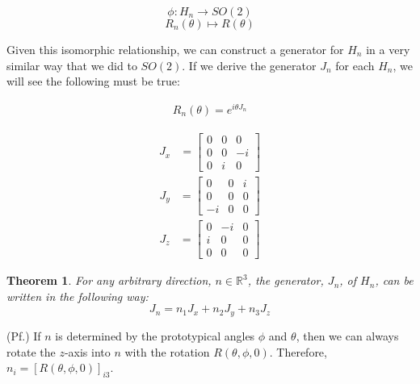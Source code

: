 \documentclass[10pt]{ucthesis}
\newcommand{\R}{\mathbb{R}}
\newtheorem{theorem}[definition]{Theorem}
\begin{document}
$$\phi:H_n \rightarrow SO(2)$$
$$R_n(\theta) \mapsto R(\theta)$$

Given this isomorphic relationship, we can construct a generator for $H_n$ in a very similar way that we did to $SO(2)$. If we derive the generator $J_n$ for each $H_n$, we will see the following must be true:

\begin{equation}
	\begin{aligned}
		R_n(\theta) = e^{i\theta J_n}
	\end{aligned}
\end{equation}

\begin{equation}
	\begin{aligned}
		J_x &= \begin{bmatrix}
					0 & 0 & 0 \\
					0 & 0 & -i \\
					0 & i & 0
					\end{bmatrix}
	\end{aligned}
\end{equation}
\begin{equation}
	\begin{aligned}
		J_y &= \begin{bmatrix}
					0 & 0 & i \\
					0 & 0 & 0 \\
					-i & 0 & 0
					\end{bmatrix}
	\end{aligned}
\end{equation}
\begin{equation}
	\begin{aligned}
		J_z &= \begin{bmatrix}
					0 & -i & 0 \\
					i & 0 & 0 \\
					0 & 0 & 0
					\end{bmatrix}
	\end{aligned}
\end{equation}


\begin{theorem}
	 For any arbitrary direction, $n\in\R^3$, the generator, $J_n$, of $H_n$, can be written in the following way:
$$J_n = n_1J_x + n_2J_y + n_3J_z$$
\end{theorem}
\noindent (Pf.) If $n$ is determined by the prototypical angles $\phi$ and $\theta$, then we can always rotate the $z$-axis into $n$ with the rotation $R(\theta,\phi,0)$. Therefore, $n_i = [R(\theta,\phi,0)]_{i3}$.
\end{document}
